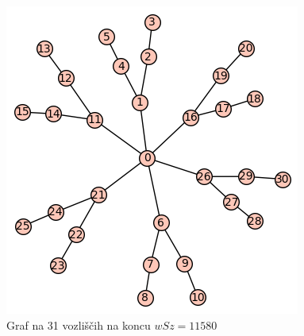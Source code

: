 \documentclass[12pt, a4paper]{article}
\begin{document}
\begin{figure}[h]
\centering
\includegraphics[scale=0.5]{koncni_graf31}
\caption{Graf na 31 vozliščih na koncu $wSz = 11580$}
\end{figure}



\newpage
\end{document}

